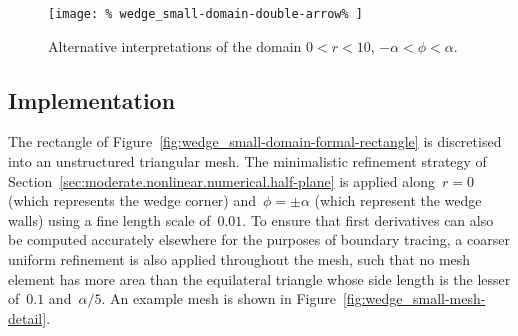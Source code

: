 \begin{figure}
  \newcommand*{\subfigurewidth}{0.3\textwidth}
  \centering
  \hspace*{\fill}
  \begin{subfigure}[t]{\subfigurewidth}
  \end{subfigure}
    \hfill
  \begin{minipage}[t]{0.25\textwidth}
    \centering
    \texttt{[image: \%
      wedge\_small-domain-double-arrow\%
    ]}
  \end{minipage}
    \hfill
  \begin{subfigure}[t]{\subfigurewidth}
  \end{subfigure}
  \hspace*{\fill}
  \caption{
    Alternative interpretations of the domain
    $0 < r < 10$, $-\alpha < \phi < \alpha$.
  }
  \label{fig:wedge_small-domain}
\end{figure}

\subsection{Implementation}
\label{sec:small.numerical.implementation}

The rectangle of Figure~\ref{fig:wedge_small-domain-formal-rectangle}
is discretised into an unstructured triangular mesh.
The minimalistic refinement strategy
of Section~\ref{sec:moderate.nonlinear.numerical.half-plane}
is applied
along~$r = 0$ (which represents the wedge corner)
and~$\phi = \pm\alpha$ (which represent the wedge walls)
using a fine length scale of~$0.01$.
To ensure that first derivatives
can also be computed accurately elsewhere
for the purposes of boundary tracing,
a coarser uniform refinement is also applied throughout the mesh,
such that no mesh element has more area than the equilateral triangle
whose side length is the lesser of~$0.1$ and~$\alpha / 5$.
An example mesh is shown in
Figure~\ref{fig:wedge_small-mesh-detail}.

\begin{figure}
\end{figure}

